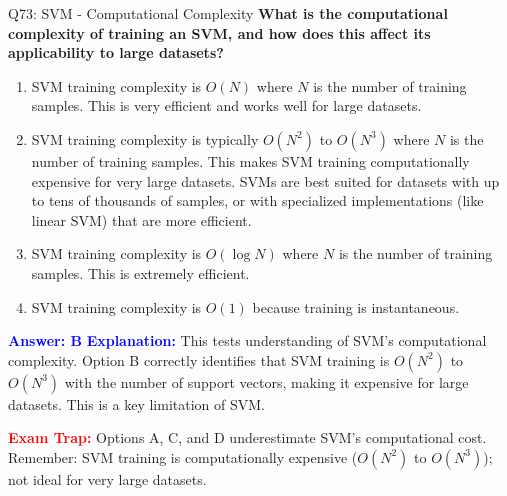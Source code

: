 \documentclass[8pt]{beamer}
\begin{document}
	\begin{frame}{Q73: SVM - Computational Complexity}
		\fontsize{6.5}{7.5}\selectfont
		\textbf{What is the computational complexity of training an SVM, and how does this affect its applicability to large datasets?}
		
		\begin{enumerate}
			\item SVM training complexity is $O(N)$ where $N$ is the number of training samples. This is very efficient and works well for large datasets.
			\item SVM training complexity is typically $O(N^2)$ to $O(N^3)$ where $N$ is the number of training samples. This makes SVM training computationally expensive for very large datasets. SVMs are best suited for datasets with up to tens of thousands of samples, or with specialized implementations (like linear SVM) that are more efficient.
			\item SVM training complexity is $O(\log N)$ where $N$ is the number of training samples. This is extremely efficient.
			\item SVM training complexity is $O(1)$ because training is instantaneous.
		\end{enumerate}
		
		\vspace{0.1cm}
		\textcolor{blue}{\textbf{Answer: B}}
		\vspace{0.1cm}
		\textcolor{blue}{\textbf{Explanation:}} This tests understanding of SVM's computational complexity. Option B correctly identifies that SVM training is $O(N^2)$ to $O(N^3)$ with the number of support vectors, making it expensive for large datasets. This is a key limitation of SVM.
		
		\textcolor{red}{\textbf{Exam Trap:}} Options A, C, and D underestimate SVM's computational cost. Remember: SVM training is computationally expensive ($O(N^2)$ to $O(N^3)$); not ideal for very large datasets.
	\end{frame}
	
\end{document}
